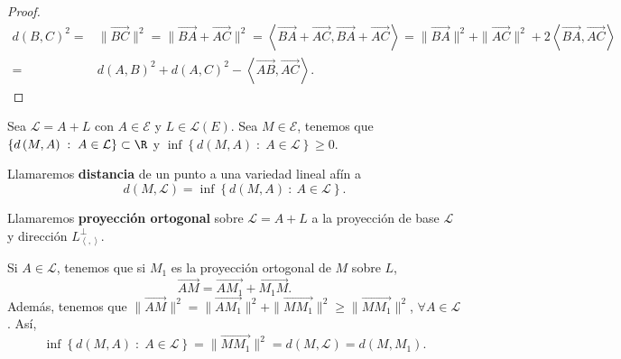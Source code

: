 \begin{proof}
\[
\begin{split}
	d\left(B,C\right)^{2} = & \|\overrightarrow{BC}\|^{2} = \|\overrightarrow{BA}+\overrightarrow{AC}\|^{2} = \left\langle \overrightarrow{BA} + \overrightarrow{AC}, \overrightarrow{BA}+\overrightarrow{AC} \right\rangle = \|\overrightarrow{BA}\|^{2} + \|\overrightarrow{AC}\|^{2} + 2\left\langle \overrightarrow{BA}, \overrightarrow{AC} \right\rangle \\
	= & d\left(A,B\right)^{2} + d\left(A,C\right)^{2}-\left\langle \overrightarrow{AB}, \overrightarrow{AC} \right\rangle  .
\end{split}
\]
\end{proof}
\begin{observation}
	\normalfont Sea $\displaystyle \mathcal{L} = A + L $ con $\displaystyle A \in \mathcal{E} $ y $\displaystyle L \in \mathcal{L}\left(E\right) $. Sea $\displaystyle M \in \mathcal{E} $, tenemos que $\displaystyle \left\{ d\left(M,A\right) \; : \; A \in \mathcal{L}\right\} \subset \R $ y $\displaystyle \inf \left\{ d\left(M,A\right) \; : \; A \in \mathcal{L}\right\} \geq 0 $.
\end{observation}
\begin{fdefinition}
\normalfont Llamaremos \textbf{distancia} de un punto a una variedad lineal afín a
\[ d\left(M, \mathcal{L}\right) = \inf \left\{ d\left(M,A\right) \: : \: A \in \mathcal{L}\right\}  .\]
\end{fdefinition}
\begin{fdefinition}
\normalfont Llamaremos \textbf{proyección ortogonal} sobre $\displaystyle \mathcal{L} = A + L $ a la proyección de base $\displaystyle \mathcal{L} $ y dirección $\displaystyle L^{\perp }_{\left\langle ,  \right\rangle } $.
\end{fdefinition}
\begin{observation}
\normalfont Si $\displaystyle A \in \mathcal{L} $, tenemos que si $\displaystyle M_{1} $ es la proyección ortogonal de $\displaystyle M $ sobre $\displaystyle L $, 
\[ \overrightarrow{AM} = \overrightarrow{AM_{1}} + \overrightarrow{M_{1}M} .\]
Además, tenemos que $\displaystyle \|\overrightarrow{AM}\|^{2} = \|\overrightarrow{AM_{1}}\|^{2} + \|\overrightarrow{MM_{1}}\|^{2} \geq \|\overrightarrow{MM_{1}}\|^{2} $, $\displaystyle \forall A \in \mathcal{L} $. Así, 
\[ \inf \left\{ d\left(M,A\right) \; : \; A \in \mathcal{L}\right\} = \|\overrightarrow{MM_{1}}\|^{2} = d\left(M, \mathcal{L}\right) = d\left(M,M_{1}\right) .\]
\end{observation}

